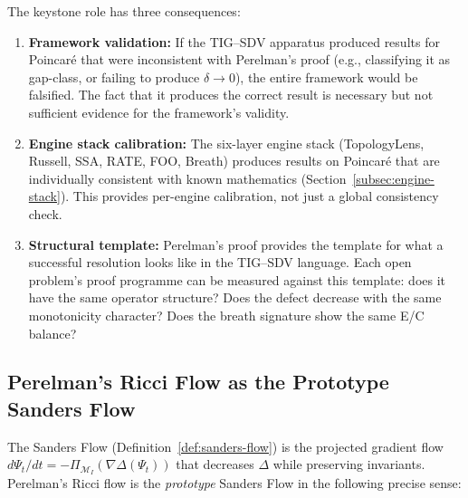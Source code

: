 \documentclass[11pt]{article}
\begin{document}
The keystone role has three consequences:
\begin{enumerate}
\item \textbf{Framework validation:} If the TIG--SDV apparatus produced
results for Poincar\'e that were inconsistent with Perelman's proof
(e.g., classifying it as gap-class, or failing to produce $\delta \to 0$),
the entire framework would be falsified.  The fact that it produces the
correct result is necessary but not sufficient evidence for the
framework's validity.

\item \textbf{Engine stack calibration:} The six-layer engine stack
(TopologyLens, Russell, SSA, RATE, FOO, Breath) produces results on
Poincar\'e that are individually consistent with known mathematics
(Section~\ref{subsec:engine-stack}).  This provides per-engine
calibration, not just a global consistency check.

\item \textbf{Structural template:} Perelman's proof provides the
template for what a successful resolution looks like in the TIG--SDV
language.  Each open problem's proof programme can be measured against
this template: does it have the same operator structure?  Does the
defect decrease with the same monotonicity character?  Does the breath
signature show the same E/C balance?
\end{enumerate}

\subsection{Perelman's Ricci Flow as the Prototype Sanders Flow}
\label{subsec:prototype}

The Sanders Flow (Definition~\ref{def:sanders-flow}) is the projected
gradient flow $d\Psi_t/dt = -\Pi_{\mathcal{M}_I}(\nabla\Delta(\Psi_t))$
that decreases $\Delta$ while preserving invariants.  Perelman's Ricci
flow is the \emph{prototype} Sanders Flow in the following precise sense:
\end{document}
